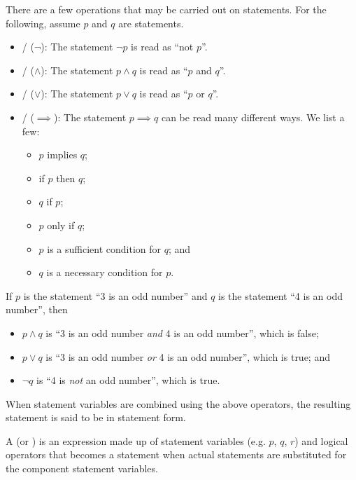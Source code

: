 There are a few operations that may be carried out on statements. For the following, assume $p$ and $q$ are statements.
\begin{itemize}
    \item {}/ ($\lnot$): The statement $\lnot p$ is read as ``not $p$''.
    \item {}/ ($\land$): The statement $p\land q$ is read as ``$p$ and $q$''.
    \item {}/ ($\lor$): The statement $p\lor q$ is read as ``$p$ or $q$''.
    \item {}/ ($\implies$): The statement $p \implies q$ can be read many different ways. We list a few:
    \begin{itemize}
        \item $p$ implies $q$;
        \item if $p$ then $q$;
        \item $q$ if $p$;
        \item $p$ only if $q$;
        \item $p$ is a sufficient condition for $q$; and
        \item $q$ is a necessary condition for $p$.
    \end{itemize}
\end{itemize}

\begin{example}
    If $p$ is the statement ``3 is an odd number'' and $q$ is the statement ``4 is an odd number'', then
    \begin{itemize}
        \item $p\land q$ is ``3 is an odd number \textit{and} 4 is an odd number'', which is false;
        \item $p\lor q$ is ``3 is an odd number \textit{or} 4 is an odd number'', which is true; and
        \item $\lnot q$ is ``4 is \textit{not} an odd number'', which is true.
    \end{itemize}
\end{example}

When statement variables are combined using the above operators, the resulting statement is said to be in statement form.
\begin{definition}
    A  (or ) is an expression made up of statement variables (e.g. $p$, $q$, $r$) and logical operators that becomes a statement when actual statements are substituted for the component statement variables.
\end{definition}

